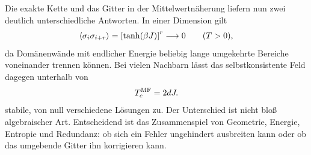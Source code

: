 Die exakte Kette und das Gitter in der Mittelwertnäherung liefern nun zwei deutlich unterschiedliche Antworten. In einer Dimension gilt
\begin{equation}
\left\langle\sigma_i\sigma_{i+r}\right\rangle
=\left[\tanh(\beta J)\right]^r
\longrightarrow0
\qquad (T>0),
\end{equation}
da Domänenwände mit endlicher Energie beliebig lange umgekehrte Bereiche voneinander trennen können. Bei vielen Nachbarn lässt das selbstkonsistente Feld dagegen unterhalb von
\begin{equation}
T_c^{\rm MF}=2dJ.
\end{equation}
stabile, von null verschiedene Lösungen zu. Der Unterschied ist nicht bloß algebraischer Art. Entscheidend ist das Zusammenspiel von Geometrie, Energie, Entropie und Redundanz: ob sich ein Fehler ungehindert ausbreiten kann oder ob das umgebende Gitter ihn korrigieren kann.